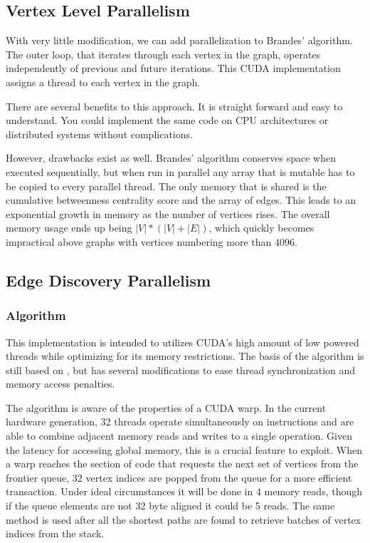 \documentclass[10pt,twocolumn]{article}
\begin{document}
\subsection{Vertex Level Parallelism}
\label{vertexPar}
With very little modification, we can add parallelization to Brandes' algorithm. The outer loop, that iterates through each vertex in the graph, operates independently of previous and future iterations. This CUDA implementation assigns a thread to each vertex in the graph.
 
There are several benefits to this approach. It is straight forward and easy to understand. You could implement the same code on CPU architectures or distributed systems without complications.
 
However, drawbacks exist as well. Brandes' algorithm conserves space when executed sequentially, but when run in parallel any array that is mutable has to be copied to every parallel thread. The only memory that is shared is the cumulative betweenness centrality score and the array of edges. This leads to an exponential growth in memory as the number of vertices rises. The overall memory usage ends up being $|V| * (|V| + |E|)$, which quickly becomes impractical above graphs with vertices numbering more than 4096.
 
\subsection{Edge Discovery Parallelism}
\subsubsection{Algorithm}
\label{implBFS}
This implementation is intended to utilizes CUDA's high amount of low powered threads while optimizing for its memory restrictions. The basis of the algorithm is still based on \cite{Brandes01afaster}, but has several modifications to ease thread synchronization and memory access penalties.
 
The algorithm is aware of the properties of a CUDA warp. In the current hardware generation, 32 threads operate simultaneously on instructions and are able to combine adjacent memory reads and writes to a single operation. Given the latency for accessing global memory, this is a crucial feature to exploit. When a warp reaches the section of code that requests the next set of vertices from the frontier queue, 32 vertex indices are popped from the queue for a more efficient transaction. Under ideal circumstances it will be done in 4 memory reads, though if the queue elements are not 32 byte aligned it could be 5 reads. The same method is used after all the shortest paths are found to retrieve batches of vertex indices from the stack.
 
\end{document}
